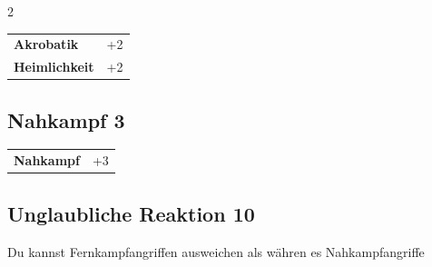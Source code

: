 \begin{multicols}{2}
\begin{tcolorbox}
\begin{tabular}{@{}ll@{}}
    \textbf{Akrobatik} & +2\\
    \textbf{Heimlichkeit} & +2\\
\end{tabular}


\end{tcolorbox}

\begin{tcolorbox}
    \subsection*{Nahkampf \hfill \small{3 }}
    \tcblower




\begin{tabular}{@{}ll@{}}
    \textbf{Nahkampf} & +3\\
\end{tabular}


\end{tcolorbox}

\begin{tcolorbox}
    \subsection*{Unglaubliche Reaktion \hfill \small{10 }}
    \tcblower
Du kannst Fernkampfangriffen ausweichen als währen es Nahkampfangriffe


\vspace{3mm}




\end{tcolorbox}
\end{multicols}
